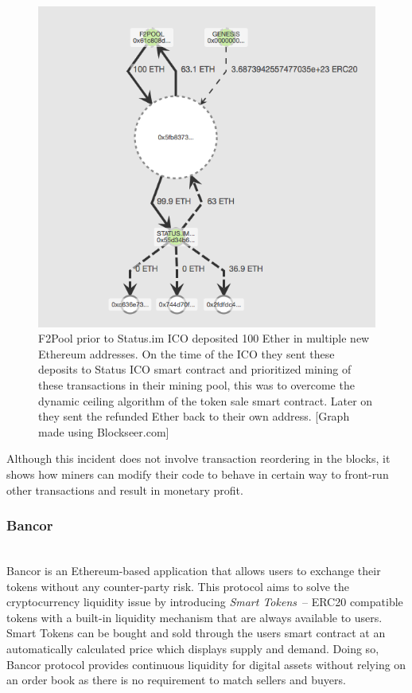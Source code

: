 \begin{figure}[h]
\centering
\includegraphics[width=0.7\linewidth]{figures/F2Pool_transactions_to_StatusICO_and_Refunds.png}
\caption{F2Pool prior to Status.im ICO deposited 100 Ether in multiple new Ethereum addresses. On the time of the ICO they sent these deposits to Status ICO smart contract and prioritized mining of these transactions in their mining pool, this was to overcome the dynamic ceiling algorithm of the token sale smart contract. Later on they sent the refunded Ether back to their own address. [Graph made using Blockseer.com] \label{fig:f2poolfront-run}}
\end{figure}


Although this incident does not involve transaction reordering in the blocks, it shows how miners can modify their code to behave in certain way to front-run other transactions and result in monetary profit. 





\subsubsection{Bancor} \hfill\\
\noindent Bancor is an Ethereum-based application that allows users to exchange their tokens without any counter-party risk. This protocol aims to solve the cryptocurrency liquidity issue by introducing \textit{Smart Tokens}~\cite{hertzog2017bancor}-- ERC20 compatible tokens with a built-in liquidity mechanism that are always available to users. Smart Tokens can be bought and sold through the users smart contract at an automatically calculated price which displays supply and demand. Doing so, Bancor protocol provides continuous liquidity for digital assets without relying on an order book as there is no requirement to match sellers and buyers.

